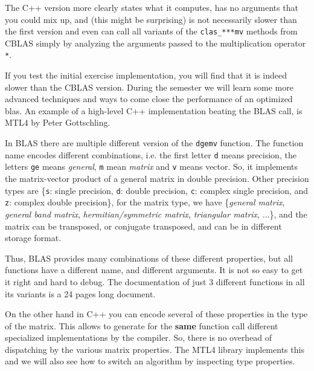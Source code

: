 The C++ version more clearly states what it computes, has no arguments that you could mix up, and (this might be
surprising) is not necessarily slower than the first version and even can call all variants of the \texttt{clas\_***mv} methods
from CBLAS simply by analyzing the arguments passed to the multiplication operator \texttt{*}.

\begin{rem}
  If you test the initial exercise implementation, you will find that it is indeed slower than the CBLAS version. During the semester
  we will learn some more advanced techniques and ways to come close the performance of an optimized blas. An example of a high-level
  C++ implementation beating the BLAS call, is MTL4 by Peter Gottschling.
\end{rem}

\begin{rem}
  In BLAS there are multiple different version of the \texttt{dgemv} function. The function name encodes different combinations, i.e.
  the first letter \texttt{d} means  precision, the letters \texttt{ge} means \textit{general}, \texttt{m} mean \textit{matrix}
  and \texttt{v} means vector. So, it implements the matrix-vector product of a general matrix in double precision. Other precision
  types are \{\texttt{s}: single precision, \texttt{d}: double precision, \texttt{c}: complex single precision, and \texttt{z}: complex
  double precision\}, for the matrix type, we have \{\textit{general matrix}, \textit{general band matrix}, \textit{hermitian/symmetric matrix},
  \textit{triangular matrix}, $\ldots$\}, and the matrix can be transposed, or conjugate transposed, and can be in different storage format.

  Thus, BLAS provides many combinations of these different properties, but all functions have a different name, and different arguments. It
  is not so easy to get it right and hard to debug. The documentation of just 3 different functions in all its variants is a 24 pages long document.

  On the other hand in C++ you can encode several of these properties in the type of the matrix. This allows to generate for the \textbf{same}
  function call different specialized implementations by the compiler. So, there is no overhead of dispatching by the various matrix properties.
  The MTL4 library implements this and we will also see how to switch an algorithm by inspecting type properties.
\end{rem}




